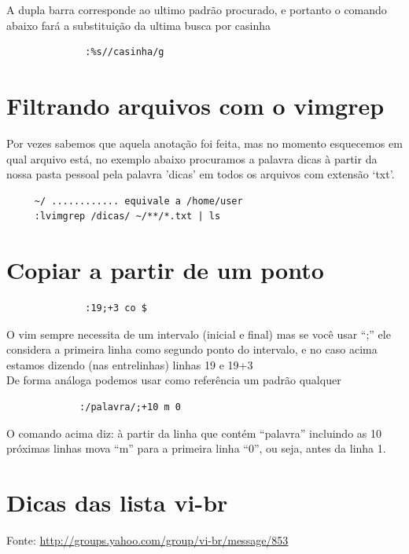 \documentclass[10pt,a4paper,openany]{book}
\begin{document}
A dupla barra corresponde ao ultimo padrão procurado, e portanto o
comando abaixo fará a substituição da ultima busca por casinha

\begin{verbatim}
			  :%s//casinha/g
\end{verbatim}

\section{Filtrando arquivos com o vimgrep}
\label{Filtrando arquivos com o vimgrep}

Por vezes sabemos que aquela anotação foi feita, mas no momento esquecemos em qual
arquivo está, no exemplo abaixo procuramos a palavra dicas à partir da nossa pasta pessoal
pela palavra 'dicas' em todos os arquivos com extensão `txt'.

\begin{verbatim}
	 ~/ ............ equivale a /home/user
	 :lvimgrep /dicas/ ~/**/*.txt | ls
\end{verbatim}


\section{Copiar a partir de um ponto}

\begin{verbatim}
			  :19;+3 co $
\end{verbatim}

O vim sempre necessita de um intervalo (inicial e final) mas se você
usar ``;'' ele considera a primeira linha como segundo ponto do
intervalo, e no caso acima estamos dizendo (nas entrelinhas) linhas
19 e 19+3     \\


De forma análoga podemos usar como referência um padrão qualquer

\begin{verbatim}
			 :/palavra/;+10 m 0
\end{verbatim}

O comando acima diz: à partir da linha que contém ``palavra'' incluindo as 10 próximas linhas
mova ``m'' para a primeira linha ``0'', ou seja, antes da linha 1.

\section{Dicas das lista vi-br}

 Fonte: \url{http://groups.yahoo.com/group/vi-br/message/853}
\end{document}
